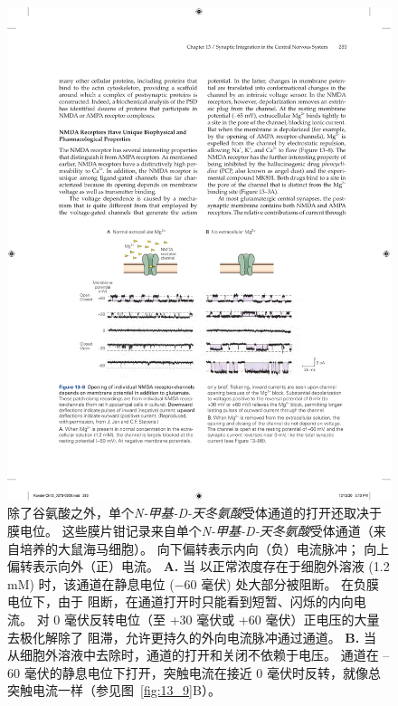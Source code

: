\begin{figure}[htbp]
	\centering
	\includegraphics[width=0.8\linewidth]{chap13/fig_13_8}
	\caption{除了谷氨酸之外，单个\textit{N-甲基-D-天冬氨酸}受体通道的打开还取决于膜电位。
		这些膜片钳记录来自单个\textit{N-甲基-D-天冬氨酸}受体通道（来自培养的大鼠海马细胞）。
		向下偏转表示内向（负）电流脉冲； 向上偏转表示向外（正）电流。
		\textbf{A.} 当  以正常浓度存在于细胞外溶液 (1.2 mM) 时，该通道在静息电位 (−60 毫伏) 处大部分被阻断。
		在负膜电位下，由于  阻断，在通道打开时只能看到短暂、闪烁的内向电流。
		对 0 毫伏反转电位（至 +30 毫伏或 +60 毫伏）正电压的大量去极化解除了  阻滞，允许更持久的外向电流脉冲通过通道。
		\textbf{B.} 当  从细胞外溶液中去除时，通道的打开和关闭不依赖于电压。
		通道在 –60 毫伏的静息电位下打开，突触电流在接近 0 毫伏时反转，就像总突触电流一样（参见图~\ref{fig:13_9}B）。}
	\label{fig:13_8}
\end{figure}



